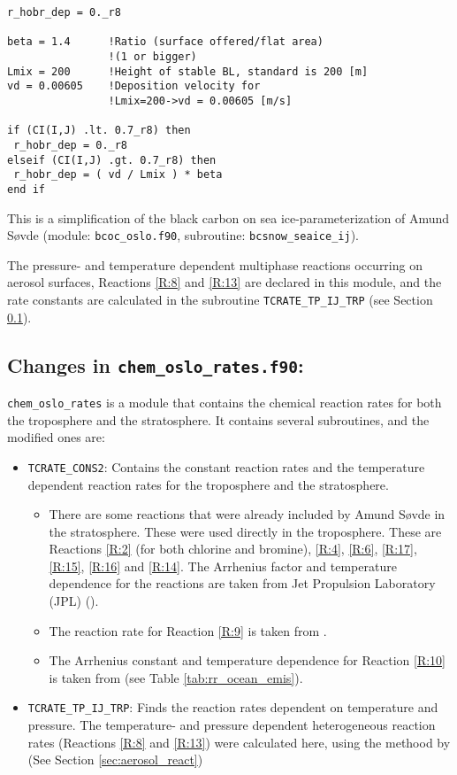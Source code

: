 \begin{lstlisting}
r_hobr_dep = 0._r8

beta = 1.4      !Ratio (surface offered/flat area)
                !(1 or bigger)
Lmix = 200      !Height of stable BL, standard is 200 [m]
vd = 0.00605    !Deposition velocity for 
                !Lmix=200->vd = 0.00605 [m/s]

if (CI(I,J) .lt. 0.7_r8) then
 r_hobr_dep = 0._r8
elseif (CI(I,J) .gt. 0.7_r8) then
 r_hobr_dep = ( vd / Lmix ) * beta
end if
\end{lstlisting}

This is a simplification of the black carbon on sea ice-parameterization of Amund Søvde (module: \texttt{bcoc\_oslo.f90}, subroutine: \texttt{bcsnow\_seaice\_ij}). 

\medskip 

 
The pressure- and temperature dependent multiphase reactions occurring on aerosol surfaces, Reactions \ref{R:8} and \ref{R:13} are declared in this module, and the rate constants are calculated in the subroutine \texttt{TCRATE\_TP\_IJ\_TRP} (see Section \ref{sec:chem_oslo_rates}). 



\subsection{Changes in \texttt{chem\_oslo\_rates.f90}:}\label{sec:chem_oslo_rates}



\texttt{chem\_oslo\_rates} is a module that contains the chemical reaction rates for both the troposphere and the stratosphere. It contains several subroutines, and the modified ones are: 

\begin{itemize}
    \item \texttt{TCRATE\_CONS2}: Contains the constant reaction rates and the temperature dependent reaction rates for the troposphere and the stratosphere. 
    \begin{itemize}
        \item There are some reactions that were already included by Amund Søvde \cite{SovdeManual} in the stratosphere. These were used directly in the troposphere. These are Reactions \ref{R:2} (for both chlorine and bromine),  \ref{R:4}, \ref{R:6}, \ref{R:17}, \ref{R:15}, \ref{R:16} and \ref{R:14}. The Arrhenius factor and temperature dependence for the reactions are taken from Jet Propulsion Laboratory (JPL) (\cite{JPL}). 
        \item The reaction rate for Reaction \ref{R:9} is taken from \cite{CAO}.
        \item The Arrhenius constant and temperature dependence for Reaction \ref{R:10} is taken from \cite{Parella}(see Table \ref{tab:rr_ocean_emis}). 
    \end{itemize}
    \item \texttt{TCRATE\_TP\_IJ\_TRP}: Finds the reaction rates dependent on temperature and pressure. The temperature- and pressure dependent heterogeneous reaction rates (Reactions \ref{R:8} and \ref{R:13}) were calculated here, using the methood by \cite{CAO} (See Section \ref{sec:aerosol_react})
\end{itemize}


